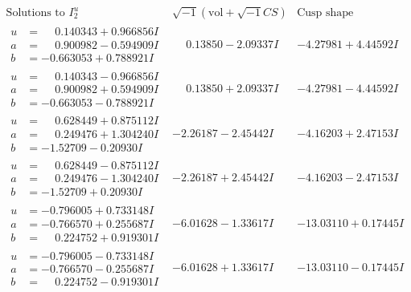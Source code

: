 \documentclass[1p]{elsarticle_modified}
\theoremstyle{definition}
\newcommand{\I}{\sqrt{-1}}
\begin{document}
$$\begin{array}{c|c|c}  
\text{Solutions to }I^u_{2}& \I (\text{vol} + \sqrt{-1}CS) & \text{Cusp shape}\\
 \hline 
\begin{aligned}
u &= \phantom{-}0.140343 + 0.966856 I \\
a &= \phantom{-}0.900982 - 0.594909 I \\
b &= -0.663053 + 0.788921 I\end{aligned}
 & \phantom{-}0.13850 - 2.09337 I & -4.27981 + 4.44592 I \\ \hline\begin{aligned}
u &= \phantom{-}0.140343 - 0.966856 I \\
a &= \phantom{-}0.900982 + 0.594909 I \\
b &= -0.663053 - 0.788921 I\end{aligned}
 & \phantom{-}0.13850 + 2.09337 I & -4.27981 - 4.44592 I \\ \hline\begin{aligned}
u &= \phantom{-}0.628449 + 0.875112 I \\
a &= \phantom{-}0.249476 + 1.304240 I \\
b &= -1.52709 - 0.20930 I\end{aligned}
 & -2.26187 - 2.45442 I & -4.16203 + 2.47153 I \\ \hline\begin{aligned}
u &= \phantom{-}0.628449 - 0.875112 I \\
a &= \phantom{-}0.249476 - 1.304240 I \\
b &= -1.52709 + 0.20930 I\end{aligned}
 & -2.26187 + 2.45442 I & -4.16203 - 2.47153 I \\ \hline\begin{aligned}
u &= -0.796005 + 0.733148 I \\
a &= -0.766570 + 0.255687 I \\
b &= \phantom{-}0.224752 + 0.919301 I\end{aligned}
 & -6.01628 - 1.33617 I & -13.03110 + 0.17445 I \\ \hline\begin{aligned}
u &= -0.796005 - 0.733148 I \\
a &= -0.766570 - 0.255687 I \\
b &= \phantom{-}0.224752 - 0.919301 I\end{aligned}
 & -6.01628 + 1.33617 I & -13.03110 - 0.17445 I \\ \hline\begin{aligned}

\end{aligned}
\end{array}$$
\end{document}
